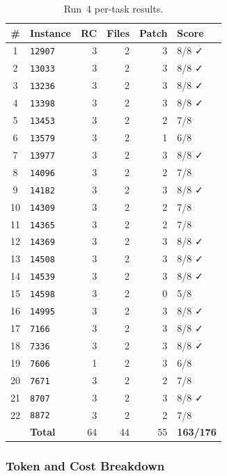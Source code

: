 \begin{table}[h]
\centering
\small
\caption{Run~4 per-task results.}\label{tab:r4-tasks}
\setlength{\tabcolsep}{4pt}
\begin{tabular}{clrrrl}
\toprule
\textbf{\#} & \textbf{Instance} & \textbf{RC} & \textbf{Files} & \textbf{Patch} & \textbf{Score} \\
\midrule
 1 & \texttt{12907} & 3 & 2 & 3 & 8/8 ✓ \\
 2 & \texttt{13033} & 3 & 2 & 3 & 8/8 ✓ \\
 3 & \texttt{13236} & 3 & 2 & 3 & 8/8 ✓ \\
 4 & \texttt{13398} & 3 & 2 & 3 & 8/8 ✓ \\
 5 & \texttt{13453} & 3 & 2 & 2 & 7/8 \\
 6 & \texttt{13579} & 3 & 2 & 1 & 6/8 \\
 7 & \texttt{13977} & 3 & 2 & 3 & 8/8 ✓ \\
 8 & \texttt{14096} & 3 & 2 & 2 & 7/8 \\
 9 & \texttt{14182} & 3 & 2 & 3 & 8/8 ✓ \\
10 & \texttt{14309} & 3 & 2 & 2 & 7/8 \\
11 & \texttt{14365} & 3 & 2 & 2 & 7/8 \\
12 & \texttt{14369} & 3 & 2 & 3 & 8/8 ✓ \\
13 & \texttt{14508} & 3 & 2 & 3 & 8/8 ✓ \\
14 & \texttt{14539} & 3 & 2 & 3 & 8/8 ✓ \\
15 & \texttt{14598} & 3 & 2 & 0 & 5/8 \\
16 & \texttt{14995} & 3 & 2 & 3 & 8/8 ✓ \\
17 & \texttt{7166}  & 3 & 2 & 3 & 8/8 ✓ \\
18 & \texttt{7336}  & 3 & 2 & 3 & 8/8 ✓ \\
19 & \texttt{7606}  & 1 & 2 & 3 & 6/8 \\
20 & \texttt{7671}  & 3 & 2 & 2 & 7/8 \\
21 & \texttt{8707}  & 3 & 2 & 3 & 8/8 ✓ \\
22 & \texttt{8872}  & 3 & 2 & 2 & 7/8 \\
\midrule
   & \textbf{Total} & 64 & 44 & 55 & \textbf{163/176} \\
\bottomrule
\end{tabular}
\end{table}

\subsubsection{Token and Cost Breakdown}

